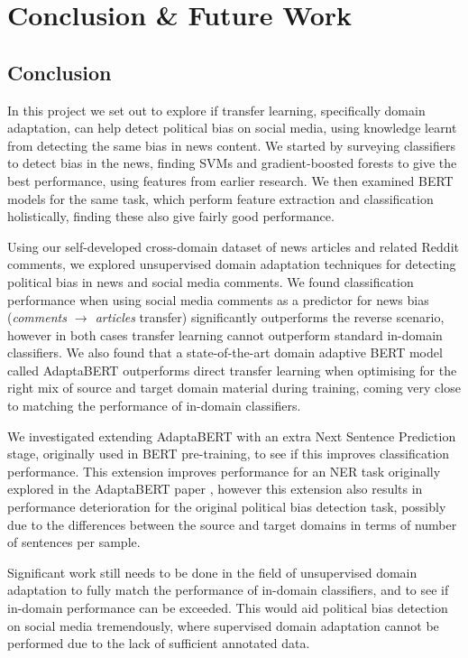 \chapter{Conclusion \& Future Work}

\section{Conclusion}

In this project we set out to explore if transfer learning, specifically domain adaptation, can help detect political bias on social media, using knowledge learnt from detecting the same bias in news content. We started by surveying classifiers to detect bias in the news, finding SVMs and gradient-boosted forests to give the best performance, using features from earlier research. We then examined BERT models for the same task, which perform feature extraction and classification holistically, finding these also give fairly good performance.

Using our self-developed cross-domain dataset of news articles and related Reddit comments, we explored unsupervised domain adaptation techniques for detecting political bias in news and social media comments. We found classification performance when using social media comments as a predictor for news bias (\textit{comments $ \rightarrow $ articles} transfer) significantly outperforms the reverse scenario, however in both cases transfer learning cannot outperform standard in-domain classifiers. We also found that a state-of-the-art domain adaptive BERT model called AdaptaBERT outperforms direct transfer learning when optimising for the right mix of source and target domain material during training, coming very close to matching the performance of in-domain classifiers.

We investigated extending AdaptaBERT with an extra Next Sentence Prediction stage, originally used in BERT pre-training, to see if this improves classification performance. This extension improves performance for an NER task originally explored in the AdaptaBERT paper \cite{adaptabert}, however this extension also results in performance deterioration for the original political bias detection task, possibly due to the differences between the source and target domains in terms of number of sentences per sample.

Significant work still needs to be done in the field of unsupervised domain adaptation to fully match the performance of in-domain classifiers, and to see if in-domain performance can be exceeded. This would aid political bias detection on social media tremendously, where supervised domain adaptation cannot be performed due to the lack of sufficient annotated data.

